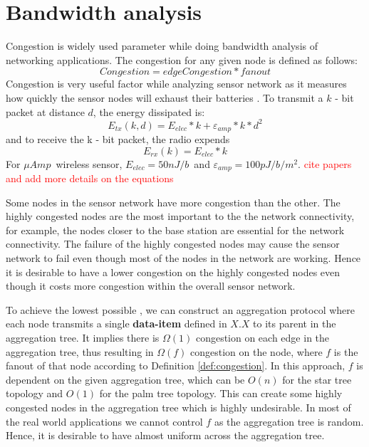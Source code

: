 \section{Bandwidth analysis}
	Congestion is widely used parameter while doing bandwidth analysis of networking applications. 
	The congestion for any given node is defined as follows:
	\begin{equation}\label{def:congestion}
		Congestion = edgeCongestion * fanout
	\end{equation}
	Congestion is very useful factor while analyzing sensor network as it measures how quickly the sensor nodes will exhaust their batteries \cite{madden2003design}. 
	To transmit a $k$ - bit packet at distance $d$, the energy dissipated is:
	\begin{equation}
		E_{tx}(k, d) = E_{elec} * k + \varepsilon_{amp} * k * d^{2}
	\end{equation}
	and to receive the k - bit packet, the radio expends
	\begin{equation}
		E_{rx}(k) = E_{elec} * k
	\end{equation}
	For $\mu Amp$\ wireless sensor, $E_{elec} = 50nJ/b$\ and $\varepsilon_{amp} = 100pJ/b/m^2$. \textcolor{red}{cite papers and add more details on the equations}

	Some nodes in the sensor network have more congestion than the other. 
	The highly congested nodes are the most important to the the network connectivity, for example, the nodes closer to the base station are essential for the network connectivity.
	The failure of the highly congested nodes may cause the sensor network to fail even though most of the nodes in the network are working.
	Hence it is desirable to have a lower congestion on the highly congested nodes even though it costs more congestion within the overall sensor network. 

	To achieve the lowest possible \informationRate, we can construct an aggregation protocol where each node transmits a single \textbf{data-item} defined in $X.X$ to its parent in the aggregation tree.
	It implies there is $\Omega(1)$ congestion on each edge in the aggregation tree, thus resulting in $\Omega(f)$ congestion on the node, where $f$ is the fanout of that node according to Definition \ref{def:congestion}.
	In this approach, $f$ is dependent on the given aggregation tree, which can be $O(n)$ for the star tree topology and $O(1)$ for the palm tree topology.
	This can create some highly congested nodes in the aggregation tree which is highly undesirable.
	In most of the real world applications we cannot control $f$ as the aggregation tree is random.
	Hence, it is desirable to have almost uniform \informationRate across the aggregation tree.


